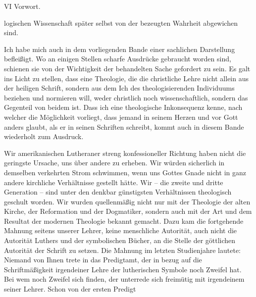 VI \hfill Vorwort.\par logischen Wissenschaft später selbst von der bezeugten Wahrheit abgewichen sind.\par Ich habe mich auch in dem vorliegenden Bande einer sachlichen Darstellung befleißigt. Wo an einigen Stellen scharfe Ausdrücke gebraucht worden sind, schienen sie von der Wichtigkeit der behandelten Sache gefordert zu sein. Es galt ins Licht zu stellen, dass eine Theologie, die die christliche Lehre nicht allein aus der heiligen Schrift, sondern aus dem Ich des theologisierenden Individuums beziehen und normieren will, weder christlich noch wissenschaftlich, sondern das Gegenteil von beidem ist. Dass ich eine theologische Inkonsequenz kenne, nach welcher die Möglichkeit vorliegt, dass jemand in seinem Herzen und vor Gott anders glaubt, als er in seinen Schriften schreibt, kommt auch in diesem Bande wiederholt zum Ausdruck.\par Wir amerikanischen Lutheraner \glqq{}streng konfessioneller Richtung\grqq{} haben nicht die geringste Ursache, uns über andere zu erheben. Wir würden sicherlich in demselben verkehrten Strom schwimmen, wenn uns Gottes Gnade nicht in ganz andere kirchliche Verhältnisse gestellt hätte. Wir -- die zweite und dritte Generation -- sind unter den denkbar günstigsten Verhältnissen theologisch geschult worden. Wir wurden quellenmäßig nicht nur mit der Theologie der alten Kirche, der Reformation und der Dogmatiker, sondern auch mit der Art und dem Resultat der modernen Theologie bekannt gemacht. Dazu kam die fortgehende Mahnung seitens unserer Lehrer, keine menschliche Autorität, auch nicht die Autorität Luthers und der symbolischen Bücher, an die Stelle der göttlichen Autorität der Schrift zu setzen. Die Mahnung im letzten Studienjahre lautete: \glqq{}Niemand von Ihnen trete in das Predigtamt, der in bezug auf die Schriftmäßigkeit irgendeiner Lehre der lutherischen Symbole noch Zweifel hat. Bei wem noch Zweifel sich finden, der unterrede sich freimütig mit irgendeinem seiner Lehrer.\grqq{} Schon von der ersten Predigt